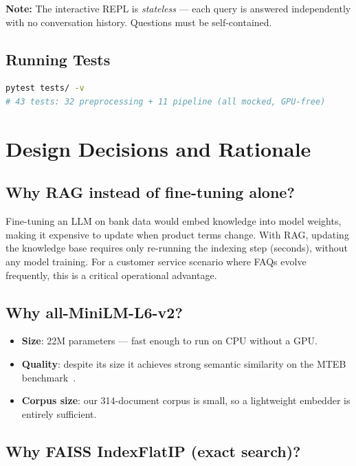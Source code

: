 \documentclass[12pt,a4paper]{article}
\begin{document}
\textbf{Note:} The interactive REPL is \emph{stateless} — each query is answered
independently with no conversation history.  Questions must be self-contained.

\subsection{Running Tests}

\begin{lstlisting}[language=bash, caption={Unit test execution (no GPU required)}]
pytest tests/ -v
# 43 tests: 32 preprocessing + 11 pipeline (all mocked, GPU-free)
\end{lstlisting}

\section{Design Decisions and Rationale}

\subsection{Why RAG instead of fine-tuning alone?}

Fine-tuning an LLM on bank data would embed knowledge into model weights, making
it expensive to update when product terms change.  With RAG, updating the
knowledge base requires only re-running the indexing step (seconds), without any
model training.  For a customer service scenario where FAQs evolve frequently,
this is a critical operational advantage.

\subsection{Why all-MiniLM-L6-v2?}

\begin{itemize}
  \item \textbf{Size}: 22M parameters — fast enough to run on CPU without a GPU.
  \item \textbf{Quality}: despite its size it achieves strong semantic similarity
        on the MTEB benchmark~\cite{muennighoff2022mteb}.
  \item \textbf{Corpus size}: our 314-document corpus is small, so a lightweight
        embedder is entirely sufficient.
\end{itemize}

\subsection{Why FAISS IndexFlatIP (exact search)?}
\end{document}
